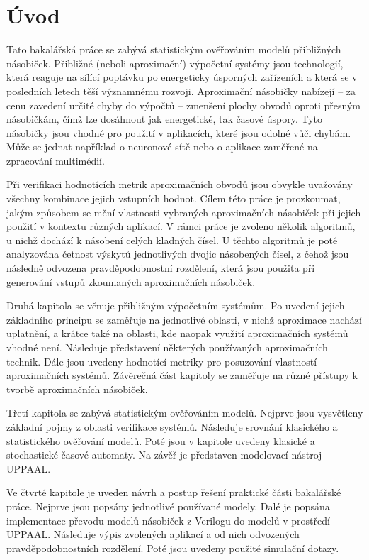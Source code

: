 
%

\chapter{Úvod}
Tato bakalářská práce se zabývá statistickým ověřováním modelů přibližných násobiček. Přibližné (neboli aproximační) výpočetní systémy jsou technologií, která reaguje na sílící poptávku po energeticky úsporných zařízeních a která se v posledních letech těší významnému rozvoji. Aproximační násobičky nabízejí -- za cenu zavedení určité chyby do výpočtů -- zmenšení plochy obvodů oproti přesným násobičkám, čímž lze dosáhnout jak energetické, tak časové úspory. Tyto násobičky jsou vhodné pro použití v aplikacích, které jsou odolné vůči chybám. Může se jednat například o neuronové sítě nebo o aplikace zaměřené na zpracování multimédií.

Při verifikaci hodnotících metrik aproximačních obvodů jsou obvykle uvažovány všechny kombinace jejich vstupních hodnot. Cílem této práce je prozkoumat, jakým způsobem se mění vlastnosti vybraných aproximačních násobiček při jejich použití v kontextu různých aplikací. V rámci práce je zvoleno několik algoritmů, u nichž dochází k násobení celých kladných čísel. U těchto algoritmů je poté analyzována četnost výskytů jednotlivých dvojic násobených čísel, z čehož jsou následně odvozena pravděpodobnostní rozdělení, která jsou použita při generování vstupů zkoumaných aproximačních násobiček.

Druhá kapitola se věnuje přibližným výpočetním systémům. Po uvedení jejich základního principu se zaměřuje na jednotlivé oblasti, v nichž aproximace nachází uplatnění, a krátce také na oblasti, kde naopak využití aproximačních systémů vhodné není. Následuje představení některých používaných aproximačních technik. Dále jsou uvedeny hodnotící metriky pro posuzování vlastností aproximačních systémů. Závěrečná část kapitoly se zaměřuje na různé přístupy k tvorbě aproximačních násobiček.

Třetí kapitola se zabývá statistickým ověřováním modelů. Nejprve jsou vysvětleny základní pojmy z oblasti verifikace systémů. Následuje srovnání klasického a statistického ověřování modelů. Poté jsou v kapitole uvedeny klasické a stochastické časové automaty. Na závěř je představen modelovací nástroj UPPAAL.

Ve čtvrté kapitole je uveden návrh a postup řešení praktické části bakalářské práce. Nejprve jsou popsány jednotlivé používané modely. Dalé je popsána implementace převodu modelů násobiček z Verilogu do modelů v prostředí UPPAAL. Následuje výpis zvolených aplikací a od nich odvozených pravděpodobnostních rozdělení. Poté jsou uvedeny použité simulační dotazy.

